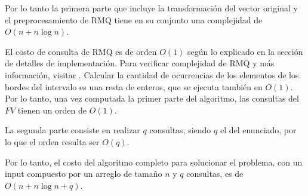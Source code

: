 Por lo tanto la primera parte que incluye la transformación del vector
original y el preprocesamiento de RMQ tiene en su conjunto una complejidad
de $O(n + n\log n)$.

El costo de consulta de RMQ es de orden $O(1)$ según lo explicado en la
sección de detalles de implementación. Para verificar complejidad de RMQ y
más información, visitar \cite{topcoder}. Calcular la cantidad de ocurrencias
de los elementos de los bordes del intervalo es una resta de enteros, que se
ejecuta también en $O(1)$. Por lo tanto, una vez computada la primer parte del
algoritmo, las consultas del $FV$ tienen un orden de $O(1)$.

La segunda parte consiste en realizar $q$ consultas, siendo $q$ el del enunciado,
por lo que el orden resulta ser $O(q)$.

Por lo tanto, el costo del algoritmo completo para solucionar el problema, con un
input compuesto por un arreglo de tamaño $n$ y $q$ consultas, es de
$O(n + n\log n + q)$.



